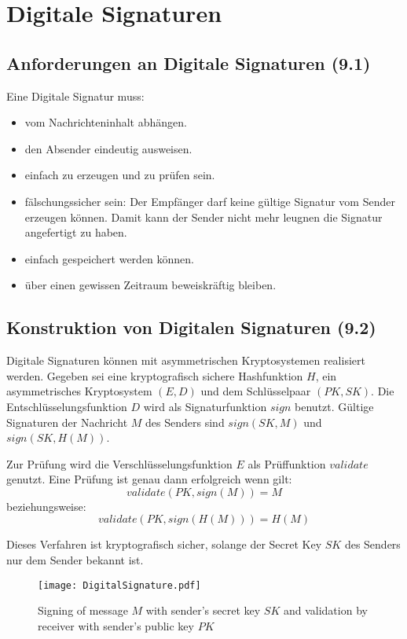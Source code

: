 \chapter{Digitale Signaturen}
\section{Anforderungen an Digitale Signaturen (9.1)}
Eine Digitale Signatur muss:
\begin{itemize}
  \item vom Nachrichteninhalt abhängen.
  \item den Absender eindeutig ausweisen.
  \item einfach zu erzeugen und zu prüfen sein.
  \item fälschungssicher sein: Der Empfänger darf keine gültige Signatur vom Sender erzeugen können. Damit kann der Sender nicht mehr leugnen die Signatur angefertigt zu haben.
  \item einfach gespeichert werden können.
  \item über einen gewissen Zeitraum beweiskräftig bleiben.
\end{itemize}

\section{Konstruktion von Digitalen Signaturen (9.2)}
Digitale Signaturen können mit asymmetrischen Kryptosystemen realisiert werden. Gegeben sei eine kryptografisch sichere Hashfunktion $H$, ein asymmetrisches Kryptosystem $(E,D)$ und dem Schlüsselpaar $(PK,SK)$. Die Entschlüsselungsfunktion $D$ wird als Signaturfunktion $sign$ benutzt. Gültige Signaturen der Nachricht $M$ des Senders sind $sign(SK, M)$ und $sign(SK, H(M))$.

Zur Prüfung wird die Verschlüsselungsfunktion $E$ als Prüffunktion $validate$ genutzt. Eine Prüfung ist genau dann erfolgreich wenn gilt:
$$
	validate(PK, sign(M)) = M
$$
beziehungsweise:
$$
	validate(PK, sign(H(M))) = H(M)
$$

Dieses Verfahren ist kryptografisch sicher, solange der Secret Key $SK$ des Senders nur dem Sender bekannt ist.

\begin{figure}[htp]
	\centering
	\texttt{[image: DigitalSignature.pdf]}
	\caption{Signing of message $M$ with sender's secret key $SK$ and validation by receiver with sender's public key $PK$}
\end{figure}


